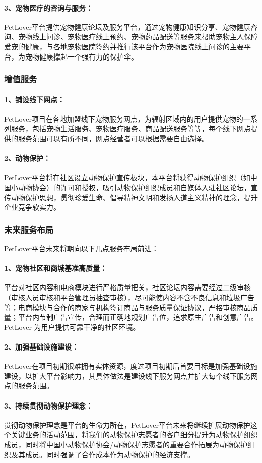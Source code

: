 \documentclass[a4paper]{ctexart}
\begin{document}
\paragraph{3、宠物医疗的咨询与服务：}PetLover平台提供宠物健康论坛及服务平台，通过宠物健康知识分享、宠物健康咨询、宠物线上问诊、宠物医疗线上预约、宠物药品配送等服务来帮助宠物主人保障爱宠的健康，与各地宠物医院签约并推行该平台作为宠物医院线上问诊的主要平台，为宠物健康撑起一个强有力的保护伞。
\subsubsection{增值服务}
\paragraph{1、铺设线下网点：}PetLover项目在各地加盟线下宠物服务网点，为辐射区域内的用户提供宠物的一系列服务，包括宠物生活服务、宠物医疗服务、商品配送服务等等，每个线下网点提供的服务范围可以有所不同，网点经营者可以根据需要自由选择。
\paragraph{2、动物保护：}PetLover平台将在社区设立动物保护宣传板块，本平台将获得动物保护组织（如中国小动物协会）的许可和授权，吸引动物保护组织成员和自媒体入驻社区论坛，宣传动物保护思想，贯彻珍爱生命、倡导精神文明和发扬人道主义精神的理念，提升企业竞争软实力。
\subsubsection{未来服务布局}
PetLover平台未来将朝向以下几点服务布局前进：
\paragraph{1、宠物社区和商城基准高质量：}平台对社区内容和电商模块进行严格质量把关，社区论坛内容需要经过二级审核（审核人员审核和平台管理员抽查审核），尽可能使内容不含不良信息和垃圾广告等；电商模块与合作的商家与机构签订商品与服务质量保证协议，严格审核商品质量；平台内节制广告宣传，合理而正确地规划广告位，追求原生广告和创意广告。PetLover 为用户提供可靠干净的社区环境。
\paragraph{2、加强基础设施建设：}PetLover在项目初期很难拥有实体资源，度过项目初期后首要目标是加强基础设施建设，以扩大平台影响力，其具体做法是建设线下服务网点并扩大每个线下服务网点的服务范围。
\paragraph{3、持续贯彻动物保护理念：}贯彻动物保护理念是平台的生命力所在，PetLover平台未来将继续扩展动物保护这个关键业务的活动范围，将我们的动物保护志愿者的客户细分提升为动物保护组织成员，同时将中国小动物保护协会/动物保护志愿者的重要合作拓展为动物保护组织及其成员。同时强调了合作成本作为动物保护的经济支撑。
\end{document}
